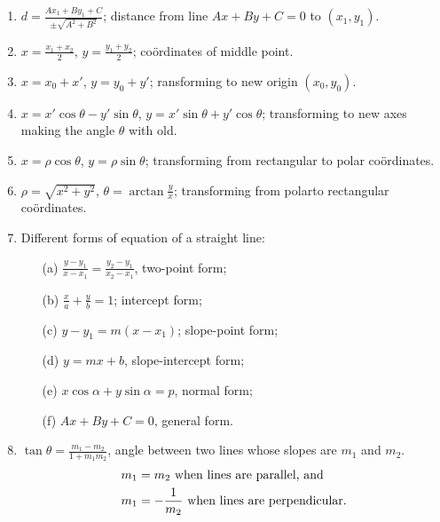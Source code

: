 \begin{enumerate}
\item
$d = \displaystyle{ \frac{Ax_1 + By_1 + C}{\pm \sqrt{A^2 + B^2}}}$;
distance from line $Ax + By + C = 0$ to $\left(x_1, y_1\right)$.

\item
$x = \displaystyle{ \frac{x_1 + x_2}{2} }$, $y = \displaystyle{ \frac{y_1 + y_2}{2} }$; 
co\"ordinates of middle point.

\item
$x = x_0 + x'$, $y = y_0 + y'$; ransforming to new origin $\left(x_0, y_0\right)$.

\item
$x = x' \cos \theta - y' \sin \theta$, $y = x' \sin \theta + y' \cos \theta$;
transforming to new axes making the angle $\theta$ with old.

\item
$x = \rho \cos \theta$, $y = \rho \sin \theta$; transforming from rectangular to polar
co\"ordinates.

\item
$\rho = \sqrt{x^2 + y^2}$, $\theta = \arctan \frac{y}{x}$; transforming from polarto
rectangular co\"ordinates.

\item
Different forms of equation of a straight line:
  \begin{itemize}
  \item[(a)]
  $\displaystyle{ \frac{y - y_1}{x - x_1} = \frac{y_2 - y_1}{x_2 - x_1}}$,
  two-point form;

  \item[(b)]
  $\frac{x}{a} + \frac{y}{b} = 1$;
  intercept form;

  \item[(c)]
  $y - y_1 = m\left(x - x_1\right)$;
  slope-point form;

  \item[(d)]
  $y = mx + b$,
  slope-intercept form;

  \item[(e)]
  $x \cos \alpha + y \sin \alpha = p$,
  normal form;

  \item[(f)]
  $Ax + By + C = 0$,
  general form.

  \end{itemize}

\item
$\displaystyle{\tan \theta = \frac{m_1 - m_2}{1 + m_1 m_2}}$, angle between two
lines whose slopes are $m_1$ and $m_2$.
\[
\begin{aligned}
m_1 & = m_2 \textnormal{ when lines are parallel, and}\\
m_1 & = - \frac{1}{m_2} \textnormal{ when lines are perpendicular.}\\
\end{aligned}
\]


\end{enumerate}
